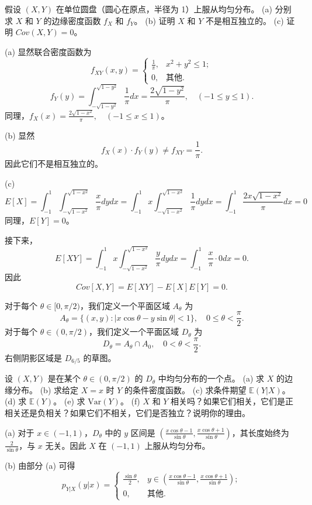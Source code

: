 \begin{questions}
\question
假设 $(X, Y)$ 在单位圆盘（圆心在原点，半径为 1）上服从均匀分布。
(a) 分别求 $X$ 和 $Y$ 的边缘密度函数 $f_X$ 和 $f_Y$。
(b) 证明 $X$ 和 $Y$ 不是相互独立的。
(c) 证明 $Cov(X, Y) = 0$。

\begin{solution}
(a) 显然联合密度函数为
\[
f_{XY}(x, y) = \begin{cases} \frac{1}{\pi}, & x^2 + y^2 \le 1; \\ 0, & \text{其他.} \end{cases}
\]
\[
f_Y(y) = \int_{-\sqrt{1-y^2}}^{\sqrt{1-y^2}} \frac{1}{\pi} dx = \frac{2\sqrt{1-y^2}}{\pi}, \quad (-1 \le y \le 1).
\]
同理，$f_X(x) = \frac{2\sqrt{1-x^2}}{\pi}, \quad (-1 \le x \le 1)$。

(b) 显然
\[
f_X(x) \cdot f_Y(y) \neq f_{XY} = \frac{1}{\pi}.
\]
因此它们不是相互独立的。

(c) 
\[
E[X] = \int_{-1}^1 \int_{-\sqrt{1-x^2}}^{\sqrt{1-x^2}} \frac{x}{\pi} dydx = \int_{-1}^1 x \int_{-\sqrt{1-x^2}}^{\sqrt{1-x^2}} \frac{1}{\pi} dydx = \int_{-1}^1 \frac{2x\sqrt{1-x^2}}{\pi} dx = 0
\]
同理，$E[Y] = 0$。

接下来，
\[
E[XY] = \int_{-1}^1 x \int_{-\sqrt{1-x^2}}^{\sqrt{1-x^2}} \frac{y}{\pi} dydx = \int_{-1}^1 \frac{x}{\pi} \cdot 0 dx = 0.
\]
因此
\[
Cov[X, Y] = E[XY] - E[X]E[Y] = 0.
\]
\end{solution}

\question
对于每个 $\theta \in [0, \pi/2)$，我们定义一个平面区域 $A_\theta$ 为
\[
A_\theta = \{(x, y) : |x \cos \theta - y \sin \theta| < 1\}, \quad 0 \leq \theta < \frac{\pi}{2}.
\]
对于每个 $\theta \in (0, \pi/2)$，我们定义一个平面区域 $D_\theta$ 为
\[
D_\theta = A_\theta \cap A_0, \quad 0 < \theta < \frac{\pi}{2}.
\]
右侧阴影区域是 $D_{6/5}$ 的草图。

设 $(X, Y)$ 是在某个 $\theta \in (0, \pi/2)$ 的 $D_\theta$ 中均匀分布的一个点。
(a) 求 $X$ 的边缘分布。
(b) 求给定 $X = x$ 时 $Y$ 的条件密度函数。
(c) 求条件期望 $\mathbb{E}(Y|X)$。
(d) 求 $\mathbb{E}(Y)$。
(e) 求 $\text{Var}(Y)$。
(f) $X$ 和 $Y$ 相关吗？如果它们相关，它们是正相关还是负相关？如果它们不相关，它们是否独立？说明你的理由。

\begin{solution}
(a) 对于 $x \in (-1, 1)$，$D_\theta$ 中的 $y$ 区间是 $\left( \frac{x \cos \theta - 1}{\sin \theta}, \frac{x \cos \theta + 1}{\sin \theta} \right)$，其长度始终为 $\frac{2}{\sin \theta}$，与 $x$ 无关。因此 $X$ 在 $(-1, 1)$ 上服从均匀分布。

(b) 由部分 (a) 可得
\[
p_{Y|X}(y|x) = \begin{cases} \frac{\sin \theta}{2}, & y \in \left( \frac{x \cos \theta - 1}{\sin \theta}, \frac{x \cos \theta + 1}{\sin \theta} \right); \\ 0, & \text{其他}. \end{cases}
\]


\end{solution}
\end{questions}
